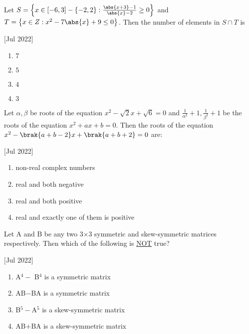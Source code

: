 \iffalse
	\title{2022}
	\author{AI24BTECH11003}
	\section{mcq-single}
\fi

    \item Let $S=\left\{ x\in \left[-6,3\right]-\left\{-2,2\right\}:\frac{\abs{x+3}-1}{\abs{x}-2} \geq 0\right\}$ and $T=\left\{ x\in Z:x^2-7\abs{x}+9\leq0\right\}$. Then the number of elements in $S\cap T$ is
    
    \hfill[Jul 2022]

        \begin{multicols}{4}
            \begin{enumerate}
                \item $7$
                \item $5$
                \item $4$
                \item $3$
            \end{enumerate}
        \end{multicols}

    \item Let $\alpha,\beta$ be roots of the equation $x^2-\sqrt{2}x+\sqrt{6}=0$ and $\frac{1}{\alpha^2}+1,\frac{1}{\beta^2}+1$ be the roots of the equation $x^2+ax+b=0$. Then the roots of the equation $x^2-\brak{a+b-2}x+\brak{a+b+2}=0$ are:
    
    \hfill[Jul 2022]

		\begin{multicols}{2}
			\begin{enumerate}
				\item non-real complex numbers
				\item real and both negative
				\item real and both positive
				\item real and exactly one of them is positive
			\end{enumerate}
		\end{multicols}

    \item Let A and B be any two 3$\times$3 symmetric and skew-symmetric matrices respectively. Then which of the following is \underline{NOT} true?
    
    \hfill[Jul 2022]

        \begin{multicols}{2}
            \begin{enumerate}
                \item A$^4 -$ B$^4$ is a symmetric matrix
                \item AB$-$BA is a symmetric matrix
                \item B$^5-$A$^5$ is a skew-symmetric matrix
                \item AB$+$BA is a skew-symmetric matrix
            \end{enumerate}
        \end{multicols}

